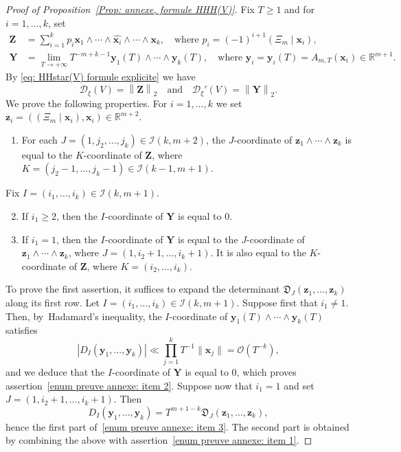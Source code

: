 \documentclass[JEP,XML,SOM,Unicode,NoFloatCountersInSection,published]{cedram}
\newcommand\bx{\boldsymbol{x}}
\newcommand\by{\boldsymbol{y}}
\newcommand\bz{\boldsymbol{z}}
\newcommand\bY{\boldsymbol{Y}}
\newcommand\bZZ{\boldsymbol{Z}}
\newcommand\bR{\mathbb{R}}
\newcommand\cD{\mathfrak{D}}
\newcommand\cI{\mathcal{I}}
\newcommand\GrO{\mathcal{O}}
\newcommand\HHH{\mathcal{D}_\xi'}
\newcommand\HHstar{\mathcal{D}_{\xi}}
\newcommand{\norm}[1]{\left\|#1 \right\|_2}
\newcommand{\normH}[1]{\|#1\|}
\newcommand{\psc}[2]{\left(#1 \mid #2\right)}
\newcommand\AND{\quad\text{and}\quad}
\theoremstyle{definition}
\theoremstyle{plain}
\begin{document}
\begin{proof}[Proof of Proposition~\ref{Prop: annexe, formule HHH(V)}]
Fix $T\geq 1$ and for $i=1,\dots,k$, set
\begin{align*}
\bZZ &= \sum_{i=1}^kp_i\bx_1\wedge \cdots \wedge\widehat{\bx_i}\wedge \cdots \wedge\bx_k, \quad \textrm{where } p_i = (-1)^{i+1}\psc{\Xi_m}{\bx_i},\\
\bY & = \lim_{T\to+\infty} T^{-m+k-1}\by_1(T)\wedge\cdots\wedge \by_k(T), \quad \textrm{where } \by_i = \by_i(T) = A_{m,T}(\bx_i) \in \bR^{m+1}.
\end{align*}
By \eqref{eq: HHstar(V) formule explicite} we have
\begin{equation*}
\HHstar(V) = \norm{\bZZ} \AND \HHH(V) = \norm{\bY}.
\end{equation*}
We prove the following properties. For $i=1,\dots,k$ we set $\bz_i = (\psc{\Xi_m}{\bx_i}, \bx_i)\in \bR^{m+2}$.
\begin{enumerate}
\item \label{enum preuve annexe: item 1} For each $J=(1,j_2,\dots,j_k)\in\cI(k,m+2)$, the $J$-coordinate of $\bz_1\wedge\cdots \wedge\bz_k$ is equal to the $K$-coordinate of $\bZZ$, where $K=(j_2-1,\dots,j_k-1)\in\cI(k-1,m+1)$.
\end{enumerate}
Fix $I = (i_1,\dots,i_k)\in\cI(k,m+1)$.
\begin{enumerate}
\setcounter{enumi}{1}
\item \label{enum preuve annexe: item 2} If $i_1 \geq 2$, then the $I$-coordinate of $\bY$ is equal to $0$.
\item \label{enum preuve annexe: item 3} If $i_1=1$, then the $I$-coordinate of $\bY$ is equal to the $J$-coordinate of $\bz_1\wedge\cdots\wedge\bz_k$, where $J = (1,i_2+1,\dots,i_k+1)$. It is also equal to the $K$-coordinate of $\bZZ$, where $K=(i_2,\dots,i_k)$.
\end{enumerate}
To prove the first assertion, it suffices to expand the determinant $\cD_{J}(\bz_1,\dots,\bz_k)$ along its first row. Let $I = (i_1,\dots,i_k)\in\cI(k,m+1)$. Suppose first that $i_1\neq 1$. Then, by~Hadamard's inequality, the $I$-coordinate of $\by_1(T)\wedge\cdots \wedge\by_k(T)$ satisfies
\[
|D_{I}(\by_1,\dots,\by_k)| \ll \prod_{j=1}^{k} T^{-1}\normH{\bx_j} = \GrO(T^{-k}),
\]
and we deduce that the $I$-coordinate of $\bY$ is equal to $0$, which proves assertion~\eqref{enum preuve annexe: item 2}. Suppose now that $i_1=1$ and set $J = (1,i_2+1,\dots,i_k+1)$. Then
\begin{equation*}
D_{I}(\by_1,\dots,\by_k) = T^{m+1-k}\cD_J(\bz_1,\dots,\bz_k),
\end{equation*}
hence the first part of~\eqref{enum preuve annexe: item 3}. The second part is obtained by combining the above with assertion~\eqref{enum preuve annexe: item 1}.


\end{proof}
\end{document}
